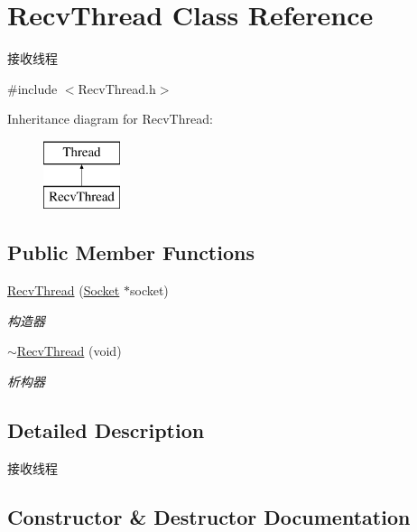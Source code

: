 \hypertarget{class_recv_thread}{}\section{Recv\+Thread Class Reference}
\label{class_recv_thread}


接收线程  




{\ttfamily \#include $<$Recv\+Thread.\+h$>$}

Inheritance diagram for Recv\+Thread\+:\begin{figure}[H]
\begin{center}
\leavevmode
\includegraphics[height=2.000000cm]{class_recv_thread}
\end{center}
\end{figure}
\subsection*{Public Member Functions}
\begin{DoxyCompactItemize}
\item 
\hyperlink{class_recv_thread_af0ac3e83c4b9a049d9acdeabbbf6721a}{Recv\+Thread} (\hyperlink{class_socket}{Socket} $\ast$socket)
\begin{DoxyCompactList}\small\item\em 构造器 \end{DoxyCompactList}\item 
\mbox{\label{class_recv_thread_a82c00d01fe10af0b6fd6a8d55fc168be}} 
\hyperlink{class_recv_thread_a82c00d01fe10af0b6fd6a8d55fc168be}{$\sim$\+Recv\+Thread} (void)
\begin{DoxyCompactList}\small\item\em 析构器 \end{DoxyCompactList}\end{DoxyCompactItemize}


\subsection{Detailed Description}
接收线程 

\subsection{Constructor \& Destructor Documentation}
\mbox{\label{class_recv_thread_af0ac3e83c4b9a049d9acdeabbbf6721a}} 
